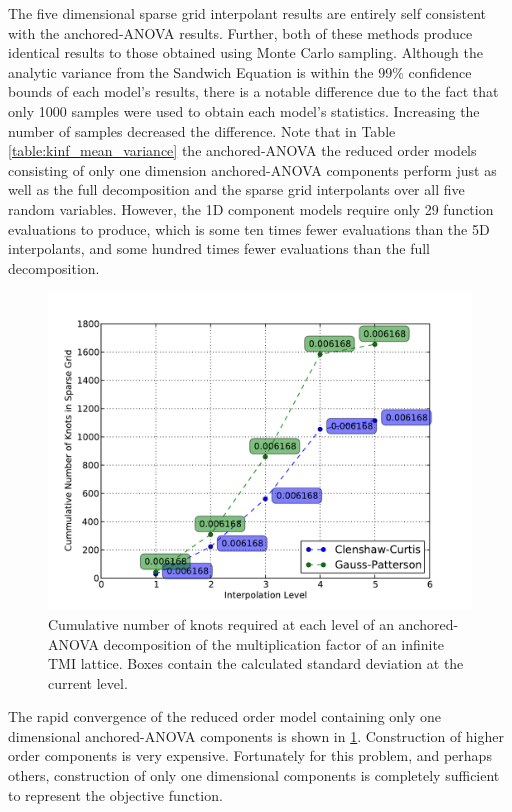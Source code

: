 The five dimensional sparse grid interpolant results are entirely self consistent with the anchored-\ac{ANOVA} results. Further, both of these methods produce identical results to those obtained using Monte Carlo sampling. Although the analytic variance from the Sandwich Equation is within the 99\% confidence bounds of each model's results, there is a notable difference due to the fact that only 1000 samples were used to obtain each model's statistics. Increasing the number of samples decreased the difference. Note that in Table \ref{table:kinf_mean_variance} the anchored-\ac{ANOVA} the reduced order models consisting of only one dimension anchored-\ac{ANOVA} components perform just as well as the full decomposition and the sparse grid interpolants over all five random variables. However, the 1D component models require only 29 function evaluations to produce, which is some ten times fewer evaluations than the 5D interpolants, and some hundred times fewer evaluations than the full decomposition. 
\begin{figure}
\caption{ \label{fig:kinf_numknots}
Cumulative number of knots required at each level of an anchored-\ac{ANOVA} decomposition of the multiplication factor of an infinite TMI lattice. Boxes contain the calculated standard deviation at the current level.}
 \begin{center}
  \includegraphics[scale=.75]{./Chapter3/kinf_sparse_grid_numknots.pdf}
 \end{center}
\end{figure}
The rapid convergence of the reduced order model containing only one dimensional anchored-\ac{ANOVA} components is shown in \ref{fig:kinf_numknots}. Construction of higher order components is very expensive. Fortunately for this problem, and perhaps others, construction of only one dimensional components is completely sufficient to represent the objective function. 


